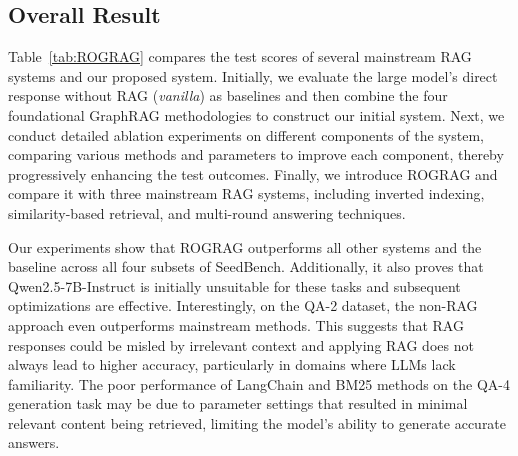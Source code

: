 \documentclass[11pt]{article}
\begin{document}
\subsection{Overall Result}
Table~\ref{tab:ROGRAG} compares the test scores of several mainstream RAG systems and our proposed system. Initially, we evaluate the large model's direct response without RAG (\textit{vanilla}) as baselines and then combine the four foundational GraphRAG methodologies to construct our initial system. Next, we conduct detailed ablation experiments on different components of the system, comparing various methods and parameters to improve each component, thereby progressively enhancing the test outcomes. Finally, we introduce ROGRAG and compare it with three mainstream RAG systems, including inverted indexing, similarity-based retrieval, and multi-round answering techniques. 

Our experiments show that ROGRAG outperforms all other systems and the baseline across all four subsets of SeedBench. Additionally, it also proves that Qwen2.5-7B-Instruct is initially unsuitable for these tasks and subsequent optimizations are effective. Interestingly, on the QA-2 dataset, the non-RAG approach even outperforms mainstream methods. This suggests that RAG responses could be misled by irrelevant context and applying RAG does not always lead to higher accuracy, particularly in domains where LLMs lack familiarity. The poor performance of LangChain \citep{Chase_LangChain_2022} and BM25 \citep{FlashRAG} methods on the QA-4 generation task may be due to parameter settings that resulted in minimal relevant content being retrieved, limiting the model's ability to generate accurate answers.

\end{document}
